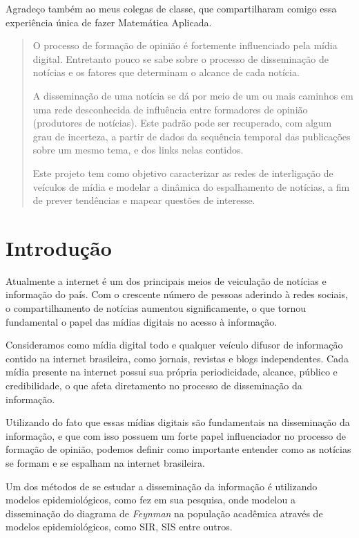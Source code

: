 \documentclass[a4paper,12pt]{article}
\begin{document}
Agradeço também ao meus colegas de classe, que compartilharam comigo essa experiência única de fazer Matemática Aplicada. 

\pagebreak
\begin{abstract}
 
O processo de formação de opinião é fortemente influenciado pela mídia digital.
Entretanto pouco se sabe sobre o processo de disseminação de notícias e os fatores que determinam o alcance de cada
notícia.

A disseminação de uma notícia se dá por meio de um ou mais caminhos em uma rede desconhecida de influência entre 
formadores de opinião (produtores de notícias). Este padrão pode ser recuperado, com algum grau de incerteza, a partir de dados
da sequência temporal das publicações sobre um mesmo tema, e dos links nelas contidos.

Este projeto tem como objetivo caracterizar as redes de interligação de veículos de mídia e modelar a dinâmica do espalhamento 
de notícias, a fim de prever tendências e mapear questões de interesse.

\end{abstract}

\pagebreak

\section{Introdução}
\onehalfspacing
Atualmente a internet é um dos principais meios de veiculação de notícias e informação do país. Com o crescente
número de pessoas aderindo à redes sociais, o compartilhamento de notícias aumentou significamente, o que tornou fundamental
o papel das mídias digitais no acesso à informação.

Consideramos como mídia digital todo e qualquer veículo difusor de informação contido na internet brasileira, como jornais, revistas e 
blogs independentes. Cada mídia presente na internet possui sua própria periodicidade, alcance, público e credibilidade, o que afeta
diretamento no processo de disseminação da informação.

Utilizando do fato que essas mídias digitais são fundamentais na disseminação da informação, e que com isso possuem um forte papel 
influenciador no processo de formação de opinião, podemos definir como importante entender como as notícias se formam e se espalham
na internet brasileira.

Um dos métodos de se estudar a disseminação da informação é utilizando modelos epidemiológicos, como \cite{bettencourt2006power} 
fez em sua pesquisa, onde modelou a disseminação do diagrama de \textit{Feynman} na população acadêmica através de modelos epidemiológicos, como SIR, SIS entre
outros.
\end{document}
